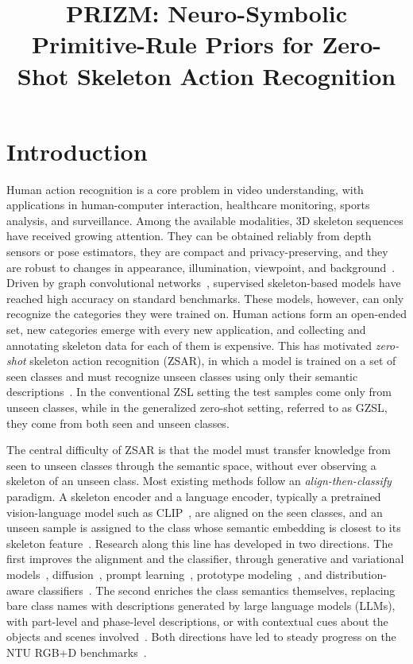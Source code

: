 \documentclass[11pt]{article}
\title{PRIZM: Neuro-Symbolic Primitive-Rule Priors for Zero-Shot Skeleton Action Recognition}
\author{}
\date{}
\begin{document}
\maketitle

\section{Introduction}

Human action recognition is a core problem in video understanding, with applications in human-computer interaction, healthcare monitoring, sports analysis, and surveillance. Among the available modalities, 3D skeleton sequences have received growing attention. They can be obtained reliably from depth sensors or pose estimators, they are compact and privacy-preserving, and they are robust to changes in appearance, illumination, viewpoint, and background~\cite{ntu60,ntu120}. Driven by graph convolutional networks~\cite{stgcn18,agcn19,shiftgcn,ctrgcn21}, supervised skeleton-based models have reached high accuracy on standard benchmarks. These models, however, can only recognize the categories they were trained on. Human actions form an open-ended set, new categories emerge with every new application, and collecting and annotating skeleton data for each of them is expensive. This has motivated \emph{zero-shot} skeleton action recognition (ZSAR), in which a model is trained on a set of seen classes and must recognize unseen classes using only their semantic descriptions~\cite{jpose19,synse21}. In the conventional ZSL setting the test samples come only from unseen classes, while in the generalized zero-shot setting, referred to as GZSL, they come from both seen and unseen classes.

The central difficulty of ZSAR is that the model must transfer knowledge from seen to unseen classes through the semantic space, without ever observing a skeleton of an unseen class. Most existing methods follow an \emph{align-then-classify} paradigm. A skeleton encoder and a language encoder, typically a pretrained vision-language model such as CLIP~\cite{clip21}, are aligned on the seen classes, and an unseen sample is assigned to the class whose semantic embedding is closest to its skeleton feature~\cite{synse21,smie23,star24,neuron25}. Research along this line has developed in two directions. The first improves the alignment and the classifier, through generative and variational models~\cite{cadavae19,savae24,fsvae25}, diffusion~\cite{tdsm25}, prompt learning~\cite{star24,scople25}, prototype modeling~\cite{neuron25}, and distribution-aware classifiers~\cite{flora26}. The second enriches the class semantics themselves, replacing bare class names with descriptions generated by large language models (LLMs), with part-level and phase-level descriptions, or with contextual cues about the objects and scenes involved~\cite{purls24,infocpl25,dynapurls,skeletoncontext}. Both directions have led to steady progress on the NTU RGB+D benchmarks~\cite{ntu60,ntu120}.
\end{document}
